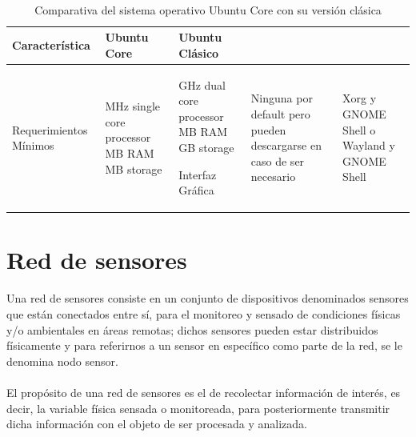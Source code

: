 \paragraph{}
\begin{longtable}{|M{3.2cm}|M{4.0cm}|M{4.0cm}|M{4.0cm}|}
    \caption{Comparativa del sistema operativo Ubuntu Core con su versión clásica}
    \label{UbuntuCore}
	\hline
	\textbf{Característica} & \textbf{Ubuntu Core} & \textbf{Ubuntu Clásico} \\ \hline
 	 
    Requerimientos Mínimos
    
    &
    
     MHz single core processor
     MB RAM
     MB storage

	&
	
     GHz dual core processor
     MB RAM
     GB storage
    \hline
        
	Interfaz Gráfica
    &
	\newline Ninguna por default pero pueden descargarse en caso de ser necesario
    &
	\newline Xorg y GNOME Shell o Wayland y GNOME Shell
	\hline
	
	
\end{longtable}


\section{Red de sensores}
Una red de sensores consiste en un conjunto de dispositivos denominados sensores que están conectados entre sí, para el monitoreo y sensado de condiciones físicas y/o ambientales en áreas remotas; dichos sensores pueden estar distribuidos físicamente y para referirnos a un sensor en específico como parte de la red, se le denomina nodo sensor. 
\paragraph{}
El propósito de una red de sensores es el de recolectar información de interés, es decir, la variable física sensada o monitoreada, para posteriormente transmitir dicha información con el objeto de ser procesada y analizada. 
